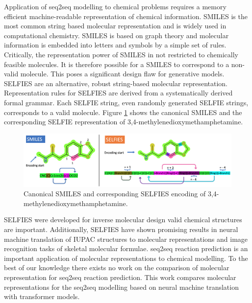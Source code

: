 \documentclass[10pt,conference,compsocconf]{IEEEtran}
\begin{document}
Application of seq2seq modelling to chemical problems requires a memory efficient machine-readable representation of chemical information. SMILES is the most common string based molecular representation and is widely used in computational chemistry.\cite{MolecularTransformer} SMILES is based on graph theory and molecular information is embedded into letters and symbols by a simple set of rules\cite{Weininger1988SMILESAC,Weininger1989SMILES2A}. Critically, the representation power of SMILES in not restricted to chemically feasible molecules.\cite{SELFIES} It is therefore possible for a SMILES to correspond to a non-valid molecule. This poses a significant design flaw for generative models. SELFIES are an alternative, robust string-based molecular representation.\cite{SELFIES} Representation rules for SELFIES are derived from a systematically derived formal grammar. Each SELFIE string, even randomly generated SELFIE strings, corresponds to a valid molecule. Figure \ref{fig:encoding} shows the canonical SMILES and the corresponding SELFIE representation of 3,4-methylenedioxymethamphetamine. \\

\begin{figure}
    \centering
    \includegraphics[width = .9\textwidth]{figures/SELFIES_SMILES_explanation.png}
    \caption{Canonical SMILES and corresponding SELFIES encoding of 3,4-methylenedioxymethamphetamine.}
    \label{fig:encoding}
\end{figure} 

SELFIES were developed for inverse molecular design valid chemical structures are important\cite{SELFIES,SelfiesBlog}. Additionally, SELFIES have shown promising results in neural machine translation of IUPAC structures to molecular representations\cite{Selfies4NMT} and image recognition tasks of skeletal molecular formulae\cite{Selfies4ImageRecognition}. seq2seq reaction prediction is an important application of molecular representations to chemical modelling. To the best of our knowledge there exists no work on the comparison of molecular representation for seq2seq reaction prediction. This work compares molecular representations for the seq2seq modelling based on neural machine translation with transformer models.
\end{document}
